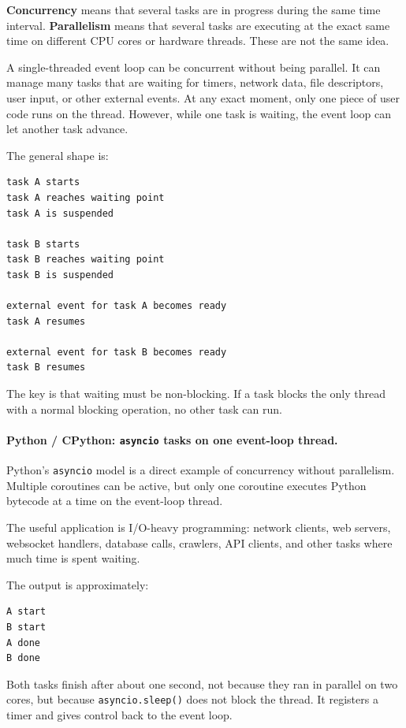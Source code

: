 \textbf{Concurrency} means that several tasks are in progress during the same time interval. \textbf{Parallelism} means that several tasks are executing at the exact same time on different CPU cores or hardware threads. These are not the same idea.

A single-threaded event loop can be concurrent without being parallel. It can manage many tasks that are waiting for timers, network data, file descriptors, user input, or other external events. At any exact moment, only one piece of user code runs on the thread. However, while one task is waiting, the event loop can let another task advance.

The general shape is:

\begin{verbatim}
task A starts
task A reaches waiting point
task A is suspended

task B starts
task B reaches waiting point
task B is suspended

external event for task A becomes ready
task A resumes

external event for task B becomes ready
task B resumes
\end{verbatim}

The key is that waiting must be non-blocking. If a task blocks the only thread with a normal blocking operation, no other task can run.

\paragraph{Python / CPython: \texttt{asyncio} tasks on one event-loop thread.}

Python's \texttt{asyncio} model is a direct example of concurrency without parallelism. Multiple coroutines can be active, but only one coroutine executes Python bytecode at a time on the event-loop thread.

The useful application is I/O-heavy programming: network clients, web servers, websocket handlers, database calls, crawlers, API clients, and other tasks where much time is spent waiting.

The output is approximately:

\begin{verbatim}
A start
B start
A done
B done
\end{verbatim}

Both tasks finish after about one second, not because they ran in parallel on two cores, but because \texttt{asyncio.sleep()} does not block the thread. It registers a timer and gives control back to the event loop.

